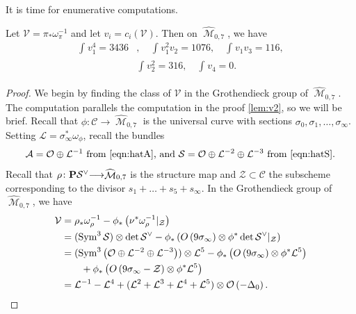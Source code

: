 \documentclass[reqno]{amsart}
\DeclareMathOperator{\M}{\mathcal{M}}
\renewcommand{\to}{{\longrightarrow}}
\renewcommand {\P}{{\bf P}}
\providecommand{\Sym}{\operatorname{Sym}}
\numberwithin{equation}{section}
\renewcommand{\O}{\mathcal{O}}
\begin{document}
It is time for enumerative computations.
\begin{proposition}\label{prop:v3}
  Let $\mathcal{V} = \pi_* \omega_{\pi}^{-1}$ and let $v_i = c_i(\mathcal{V})$.
  Then on $\widehat{\M}_{0,7}$, we have
  \[
    \begin{split}
      \int_{}v_{1}^{4} = 3436&, \quad \int_{}v_{1}^{2}v_{2} = 1076,\quad \int_{}v_{1}v_{3} = 116,\\
      &\int_{}v_2^{2} = 316,\quad \int_{}v_{4} = 0.
    \end{split}
  \]
\end{proposition}
\begin{proof}
  We begin by finding the class of $\mathcal{V}$ in the Grothendieck group of $\widehat{\M}_{0,7}$.
  The computation parallels the computation in the proof \autoref{lem:v2}, so we will be brief.
  Recall that $\phi \colon \mathcal{C} \to \widehat{\M}_{0,7}$ is the universal curve with sections $\sigma_0, \sigma_1, \dots, \sigma_{\infty}$.
  Setting $\mathcal{L} = \sigma_{\infty}^* \omega_{\phi}$, recall the bundles
  \begin{align}
    \mathcal{A} = \O \oplus \mathcal{L}^{-1} \text{ from \eqref{eqn:hatA}, and }
    \mathcal{S} = \O \oplus \mathcal{L}^{-2} \oplus \mathcal{L}^{-3} \text{ from \eqref{eqn:hatS}}.
  \end{align}
  Recall that $\rho \colon \P \mathcal{S}^{\vee} \to \widehat{\M}_{0,7}$ is the structure map and $\mathcal{Z} \subset \mathcal{C}$ the subscheme corresponding to the divisor $s_1 + \dots + s_5 + s_{\infty}$.
  In the Grothendieck group of $\widehat{\M}_{0,7}$, we have
  \begin{equation}\label{eqn:v31}
    \begin{split}
      \mathcal{V} &= \rho_* \omega^{-1}_{\rho} - \phi_* \left( \nu^* \omega^{-1}_{\rho} |_{\mathcal{Z}}\right)\\
      &= (\Sym^3 \mathcal{S}) \otimes \det \mathcal{S}^{\vee} - \phi_*\left(\mathcal \O\left(9\sigma_{\infty}\right) \otimes \phi^*\det \mathcal{S}^{\vee}|_{\mathcal{Z}}\right)\\
      &= (\Sym^3 \left( \O \oplus \mathcal{L}^{-2} \oplus \mathcal{L}^{-3} \right)) \otimes \mathcal{L}^5 - \phi_*\left(\mathcal \O\left(9\sigma_{\infty}\right) \otimes \phi^*\mathcal{L}^5\right) \\
      & \qquad +  \phi_*\left(\mathcal \O\left(9\sigma_{\infty}-{\mathcal{Z}}\right) \otimes \phi^*\mathcal{L}^5\right)\\
      &= \mathcal{L}^{-1} - \mathcal{L}^4 + (\mathcal{L}^2 + \mathcal{L}^3 + \mathcal{L}^4 + \mathcal{L}^5) \otimes \O\left(-\Delta_0\right).

\end{split}
\end{equation}
\end{proof}
\end{document}
